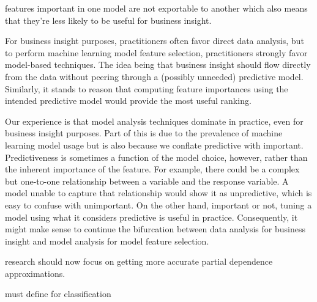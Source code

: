 \documentclass[twoside,11pt]{article}
\begin{document}
features important in one model are not exportable to another which also means that they're less likely to be useful for business insight.
 
For business insight purposes, practitioners often favor direct data analysis, but to perform machine learning model feature selection, practitioners strongly favor model-based techniques. The idea being that business insight should flow directly from the data without peering through a (possibly unneeded) predictive model.  Similarly, it stands to reason that computing feature importances using the intended predictive model would provide the most useful ranking.

Our experience is that model analysis techniques dominate in practice, even for business insight purposes. Part of this is due to the prevalence of machine learning model usage but is also because we conflate predictive with important.  Predictiveness is sometimes a function of the model choice, however, rather than the inherent importance of the feature. For example, there could be a complex but one-to-one relationship between a variable and the response variable. A model unable to capture that relationship would show it as unpredictive, which is easy to confuse with unimportant.  On the other hand, important or not, tuning a model using what it considers predictive is useful in practice. Consequently, it might make sense to continue the bifurcation between data analysis for business insight and model analysis for model feature selection.

research should now focus on getting more accurate partial dependence approximations.

must define for classification

\vskip 0.2in

\end{document}
